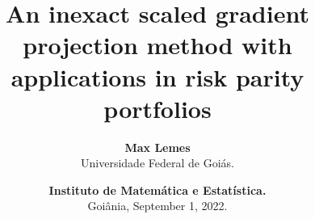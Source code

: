 \title
  {
    An inexact scaled gradient projection method with applications in risk parity portfolios
  }

\author[M. ~Lemes] %
  {
   \textbf{Max Lemes} \\
   Universidade Federal de Goiás.
  }



\date%
  {
    \textcolor{mLightBrown}{\textbf{Instituto de Matemática e Estatística.}}\\
    Goiânia, September 1, 2022.
  }